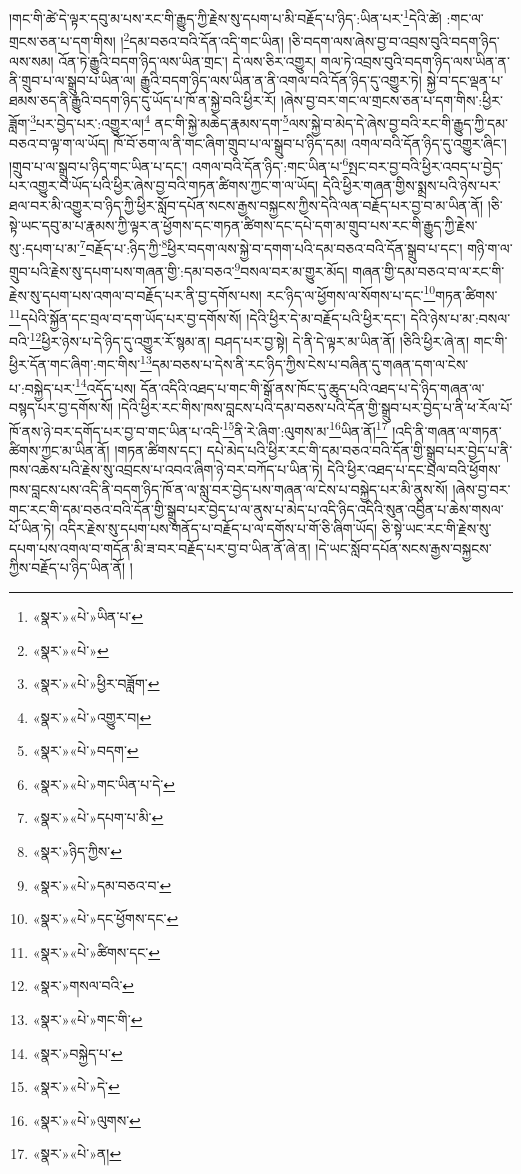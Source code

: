 །གང་གི་ཚེ་དེ་ལྟར་དབུ་མ་པས་རང་གི་རྒྱུད་ཀྱི་རྗེས་སུ་དཔག་པ་མི་བརྗོད་པ་ཉིད་:ཡིན་པར་\footnote{«སྣར་»«པེ་»ཡིན་པ་}དེའི་ཚེ། :གང་ལ་གྲངས་ཅན་པ་དག་གིས། །\footnote{«སྣར་»«པེ་»}དམ་བཅའ་བའི་དོན་འདི་གང་ཡིན། །ཅི་བདག་ལས་ཞེས་བྱ་བ་འབྲས་བུའི་བདག་ཉིད་ལས་སམ། འོན་ཏེ་རྒྱུའི་བདག་ཉིད་ལས་ཡིན་གྲང་། དེ་ལས་ཅིར་འགྱུར། གལ་ཏེ་འབྲས་བུའི་བདག་ཉིད་ལས་ཡིན་ན་ནི་གྲུབ་པ་ལ་སྒྲུབ་པ་ཡིན་ལ། རྒྱུའི་བདག་ཉིད་ལས་ཡིན་ན་ནི་འགལ་བའི་དོན་ཉིད་དུ་འགྱུར་ཏེ། སྐྱེ་བ་དང་ལྡན་པ་ཐམས་ཅད་ནི་རྒྱུའི་བདག་ཉིད་དུ་ཡོད་པ་ཁོ་ན་སྐྱེ་བའི་ཕྱིར་རོ། །ཞེས་བྱ་བར་གང་ལ་གྲངས་ཅན་པ་དག་གིས་:ཕྱིར་ཟློག་\footnote{«སྣར་»«པེ་»ཕྱིར་བཟློག་}པར་བྱེད་པར་:འགྱུར་ལ།\footnote{«སྣར་»«པེ་»འགྱུར་བ།} ནང་གི་སྐྱེ་མཆེད་རྣམས་དག་\footnote{«སྣར་»«པེ་»བདག་}ལས་སྐྱེ་བ་མེད་དེ་ཞེས་བྱ་བའི་རང་གི་རྒྱུད་ཀྱི་དམ་བཅའ་བ་ལྟ་ག་ལ་ཡོད། ཁོ་བོ་ཅག་ལ་ནི་གང་ཞིག་གྲུབ་པ་ལ་སྒྲུབ་པ་ཉིད་དམ། འགལ་བའི་དོན་ཉིད་དུ་འགྱུར་ཞིང་། །གྲུབ་པ་ལ་སྒྲུབ་པ་ཉིད་གང་ཡིན་པ་དང་། འགལ་བའི་དོན་ཉིད་:གང་ཡིན་པ་\footnote{«སྣར་»«པེ་»གང་ཡིན་པ་དེ་}སྤང་བར་བྱ་བའི་ཕྱིར་འབད་པ་བྱེད་པར་འགྱུར་བ་ཡོད་པའི་ཕྱིར་ཞེས་བྱ་བའི་གཏན་ཚིགས་ཀྱང་ག་ལ་ཡོད། དེའི་ཕྱིར་གཞན་གྱིས་སྨྲས་པའི་ཉེས་པར་ཐལ་བར་མི་འགྱུར་བ་ཉིད་ཀྱི་ཕྱིར་སློབ་དཔོན་སངས་རྒྱས་བསྐྱངས་ཀྱིས་དེའི་ལན་བརྗོད་པར་བྱ་བ་མ་ཡིན་ནོ། །ཅི་སྟེ་ཡང་དབུ་མ་པ་རྣམས་ཀྱི་ལྟར་ན་ཕྱོགས་དང་གཏན་ཚིགས་དང་དཔེ་དག་མ་གྲུབ་པས་རང་གི་རྒྱུད་ཀྱི་རྗེས་སུ་:དཔག་པ་མ་\footnote{«སྣར་»«པེ་»དཔག་པ་མི་}བརྗོད་པ་:ཉིད་ཀྱི་\footnote{«སྣར་»ཉིད་ཀྱིས་}ཕྱིར་བདག་ལས་སྐྱེ་བ་དགག་པའི་དམ་བཅའ་བའི་དོན་སྒྲུབ་པ་དང་། གཉི་ག་ལ་གྲུབ་པའི་རྗེས་སུ་དཔག་པས་གཞན་གྱི་:དམ་བཅའ་\footnote{«སྣར་»«པེ་»དམ་བཅའ་བ་}བསལ་བར་མ་གྱུར་མོད། གཞན་གྱི་དམ་བཅའ་བ་ལ་རང་གི་རྗེས་སུ་དཔག་པས་འགལ་བ་བརྗོད་པར་ནི་བྱ་དགོས་པས། རང་ཉིད་ལ་ཕྱོགས་ལ་སོགས་པ་དང་\footnote{«སྣར་»«པེ་»དང་ཕྱོགས་དང་}གཏན་ཚིགས་\footnote{«སྣར་»«པེ་»ཚིགས་དང་}དཔེའི་སྐྱོན་དང་བྲལ་བ་དག་ཡོད་པར་བྱ་དགོས་སོ། །དེའི་ཕྱིར་དེ་མ་བརྗོད་པའི་ཕྱིར་དང་། དེའི་ཉེས་པ་མ་:བསལ་བའི་\footnote{«སྣར་»གསལ་བའི་}ཕྱིར་ཉེས་པ་དེ་ཉིད་དུ་འགྱུར་རོ་སྙམ་ན། བཤད་པར་བྱ་སྟེ། དེ་ནི་དེ་ལྟར་མ་ཡིན་ནོ། །ཅིའི་ཕྱིར་ཞེ་ན། གང་གི་ཕྱིར་དོན་གང་ཞིག་:གང་གིས་\footnote{«སྣར་»«པེ་»གང་གི་}དམ་བཅས་པ་དེས་ནི་རང་ཉིད་ཀྱིས་ངེས་པ་བཞིན་དུ་གཞན་དག་ལ་ངེས་པ་:བསྐྱེད་པར་\footnote{«སྣར་»བསྐྱེད་པ་}འདོད་པས། དོན་འདིའི་འཐད་པ་གང་གི་སྒོ་ནས་ཁོང་དུ་ཆུད་པའི་འཐད་པ་དེ་ཉིད་གཞན་ལ་བསྙད་པར་བྱ་དགོས་སོ། །དེའི་ཕྱིར་རང་གིས་ཁས་བླངས་པའི་དམ་བཅས་པའི་དོན་གྱི་སྒྲུབ་པར་བྱེད་པ་ནི་ཕ་རོལ་པོ་ཁོ་ནས་ཉེ་བར་དགོད་པར་བྱ་བ་གང་ཡིན་པ་འདི་\footnote{«སྣར་»«པེ་»དེ་}ནི་རེ་ཞིག་:ལུགས་མ་\footnote{«སྣར་»«པེ་»ལུགས་}ཡིན་ནོ།\footnote{«སྣར་»«པེ་»ན།} །འདི་ནི་གཞན་ལ་གཏན་ཚིགས་ཀྱང་མ་ཡིན་ནོ། །གཏན་ཚིགས་དང་། དཔེ་མེད་པའི་ཕྱིར་རང་གི་དམ་བཅའ་བའི་དོན་གྱི་སྒྲུབ་པར་བྱེད་པ་ནི་ཁས་འཆེས་པའི་རྗེས་སུ་འབྲངས་པ་འབའ་ཞིག་ཉེ་བར་བཀོད་པ་ཡིན་ཏེ། དེའི་ཕྱིར་འཐད་པ་དང་བྲལ་བའི་ཕྱོགས་ཁས་བླངས་པས་འདི་ནི་བདག་ཉིད་ཁོ་ན་ལ་སླུ་བར་བྱེད་པས་གཞན་ལ་ངེས་པ་བསྐྱེད་པར་མི་ནུས་སོ། །ཞེས་བྱ་བར་གང་རང་གི་དམ་བཅའ་བའི་དོན་གྱི་སྒྲུབ་པར་བྱེད་པ་ལ་ནུས་པ་མེད་པ་འདི་ཉིད་འདིའི་སུན་འབྱིན་པ་ཆེས་གསལ་པོ་ཡིན་ཏེ། འདིར་རྗེས་སུ་དཔག་པས་གནོད་པ་བརྗོད་པ་ལ་དགོས་པ་གོ་ཅི་ཞིག་ཡོད། ཅི་སྟེ་ཡང་རང་གི་རྗེས་སུ་དཔག་པས་འགལ་བ་གདོན་མི་ཟ་བར་བརྗོད་པར་བྱ་བ་ཡིན་ནོ་ཞེ་ན། །དེ་ཡང་སློབ་དཔོན་སངས་རྒྱས་བསྐྱངས་ཀྱིས་བརྗོད་པ་ཉིད་ཡིན་ནོ། །
